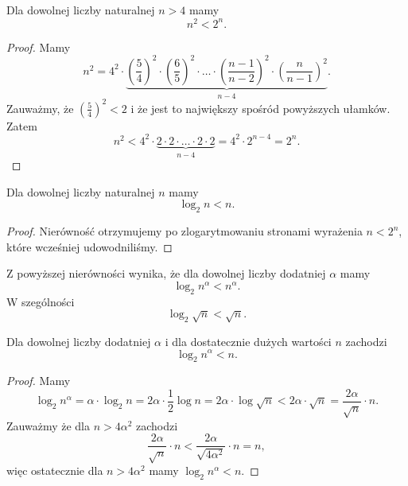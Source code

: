 \documentclass[a4paper,10pt]{beamer}
\begin{document}
\begin{frame}

\begin{block}{}
Dla dowolnej liczby naturalnej $n>4$ mamy $$n^2<2^n.$$
\end{block}{}

\begin{proof}
Mamy
$$n^2=4^2\cdot\underbrace{\left(\frac54\right)^2\cdot\left(\frac65\right)^2\cdot\ldots\cdot\left(\frac{n-1}{n-2}\right)^2\cdot\left(\frac{n}{n-1}\right)^2}_{n-4}.$$
Zauważmy, że $\displaystyle\left(\frac54\right)^2<2$ i że jest to największy spośród powyższych ułamków. Zatem
$$n^2<4^2\cdot\underbrace{2\cdot2\cdot\ldots\cdot2\cdot2}_{n-4}=4^2\cdot2^{n-4}=2^n.$$
\end{proof}
\end{frame}



\begin{frame}
\begin{block}{}
Dla dowolnej liczby naturalnej $n$ mamy $$\log_2n<n.$$
\end{block}{}

\begin{proof}
Nierówność otrzymujemy po zlogarytmowaniu stronami wyrażenia $n<2^n$, które wcześniej udowodniliśmy.
\end{proof}

\medskip

Z powyższej nierówności wynika, że dla dowolnej liczby dodatniej $\alpha$ mamy $$\log_2n^\alpha<n^\alpha.$$ W szególności $$\log_2\sqrt{n}<\sqrt{n}.$$
\end{frame}

\begin{frame}
\begin{block}{}
Dla dowolnej liczby dodatniej $\alpha$ i dla dostatecznie dużych wartości $n$ zachodzi $$\log_2n^\alpha<n.$$
\end{block}{}

\begin{proof}
Mamy $$\log_2n^\alpha=\alpha\cdot\log_2n=2\alpha\cdot\frac12\log n=2\alpha\cdot\log\sqrt{n}<2\alpha\cdot\sqrt{n}=\frac{2\alpha}{\sqrt{n}}\cdot n.$$
Zauważmy że dla $n>4\alpha^2$ zachodzi
$$\frac{2\alpha}{\sqrt{n}}\cdot n<\frac{2\alpha}{\sqrt{4\alpha^2}}\cdot n=n,$$
więc ostatecznie dla $n>4\alpha^2$ mamy $\log_2n^\alpha<n.$
\end{proof}
\end{frame}
\end{document}
